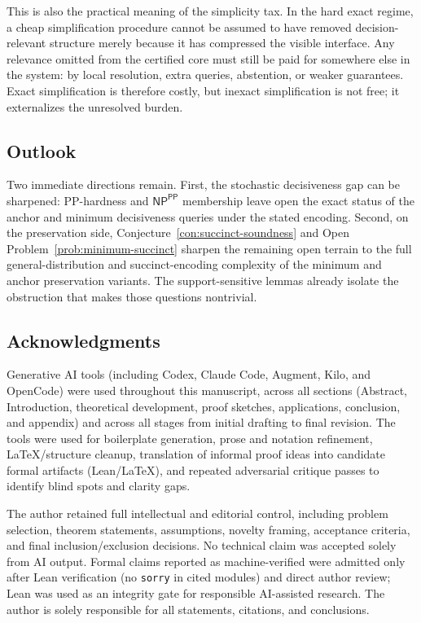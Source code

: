 This is also the practical meaning of the simplicity tax. In the hard exact regime, a cheap simplification procedure cannot be assumed to have removed decision-relevant structure merely because it has compressed the visible interface. Any relevance omitted from the certified core must still be paid for somewhere else in the system: by local resolution, extra queries, abstention, or weaker guarantees. Exact simplification is therefore costly, but inexact simplification is not free; it externalizes the unresolved burden.

\subsection*{Outlook}

Two immediate directions remain. First, the stochastic decisiveness gap can be sharpened: PP-hardness and $\textsf{NP}^{\textsf{PP}}$ membership leave open the exact status of the anchor and minimum decisiveness queries under the stated encoding. Second, on the preservation side, Conjecture~\ref{con:succinct-soundness} and Open Problem~\ref{prob:minimum-succinct} sharpen the remaining open terrain to the full general-distribution and succinct-encoding complexity of the minimum and anchor preservation variants. The support-sensitive lemmas already isolate the obstruction that makes those questions nontrivial. 

\subsection*{Acknowledgments}

Generative AI tools (including Codex, Claude Code, Augment, Kilo, and OpenCode) were used throughout this manuscript, across all sections (Abstract, Introduction, theoretical development, proof sketches, applications, conclusion, and appendix) and across all stages from initial drafting to final revision. The tools were used for boilerplate generation, prose and notation refinement, \LaTeX{}/structure cleanup, translation of informal proof ideas into candidate formal artifacts (Lean/\LaTeX{}), and repeated adversarial critique passes to identify blind spots and clarity gaps.

The author retained full intellectual and editorial control, including problem selection, theorem statements, assumptions, novelty framing, acceptance criteria, and final inclusion/exclusion decisions. No technical claim was accepted solely from AI output. Formal claims reported as machine-verified were admitted only after Lean verification (no \texttt{sorry} in cited modules) and direct author review; Lean was used as an integrity gate for responsible AI-assisted research. The author is solely responsible for all statements, citations, and conclusions.

\appendix
